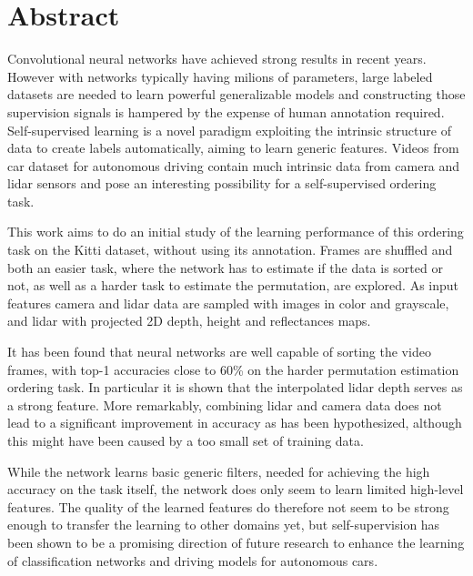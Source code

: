%

\newpage
\vspace{3cm}

\chapter*{Abstract}
Convolutional neural networks have achieved strong results in recent years. However with networks typically having milions of parameters, large labeled datasets are needed to learn powerful generalizable models and constructing those supervision signals is hampered by the expense of human annotation required. Self-supervised learning is a novel paradigm exploiting the intrinsic structure of data to create labels automatically, aiming to learn generic features. Videos from car dataset for autonomous driving contain much intrinsic data from camera and lidar sensors and pose an interesting possibility for a self-supervised ordering task. 

This work aims to do an initial study of the learning performance of this ordering task on the Kitti dataset, without using its annotation. Frames are shuffled and both an easier task, where the network has to estimate if the data is sorted or not, as well as a harder task to estimate the permutation, are explored. As input features camera and lidar data are sampled with images in color and grayscale, and lidar with projected 2D depth, height and reflectances maps.

It has been found that neural networks are well capable of sorting the video frames, with top-1 accuracies close to 60\% on the harder permutation estimation ordering task. In particular it is shown that the interpolated lidar depth serves as a strong feature. More remarkably, combining lidar and camera data does not lead to a significant improvement in accuracy as has been hypothesized, although this might have been caused by a too small set of training data.

While the network learns basic generic filters, needed for achieving the high accuracy on the task itself, the network does only seem to learn limited high-level features. The quality of the learned features do therefore not seem to be strong enough to transfer the learning to other domains yet, but self-supervision has been shown to be a promising direction of future research to enhance the learning of classification networks and driving models for autonomous cars.

